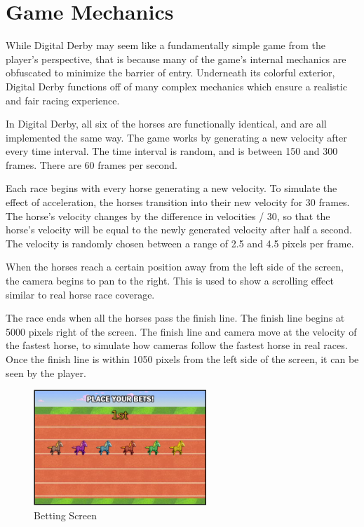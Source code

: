 \documentclass{article}
\begin{document}
\vspace{2ex}
\section{Game Mechanics}
{
While Digital Derby may seem like a fundamentally simple game from the player's perspective, that is because many of the game's internal mechanics are obfuscated to minimize the barrier of entry. Underneath its colorful exterior, Digital Derby functions off of many complex mechanics which ensure a realistic and fair racing experience.
\vspace{2ex}

In Digital Derby, all six of the horses are functionally identical, and are all implemented the same way. The game works by generating a new velocity after every time interval. The time interval is random, and is between 150 and 300 frames. There are 60 frames per second.

\vspace{2ex}

Each race begins with every horse generating a new velocity. To simulate the effect of acceleration, the horses transition into their new velocity for 30 frames. The horse’s velocity changes by the difference in velocities / 30, so that the horse’s velocity will be equal to the newly generated velocity after half a second. The velocity is randomly chosen between a range of 2.5 and 4.5 pixels per frame.

\vspace{2ex}

When the horses reach a certain position away from the left side of the screen, the camera begins to pan to the right. This is used to show a scrolling effect similar to real horse race coverage.

\vspace{2ex}

The race ends when all the horses pass the finish line. The finish line begins at 5000 pixels right of the screen. The finish line and camera move at the velocity of the fastest horse, to simulate how cameras follow the fastest horse in real races. Once the finish line is within 1050 pixels from the left side of the screen, it can be seen by the player. 

\vspace{2ex}
}

\begin{figure}[h]
\centering
\includegraphics[width=6.5cm]{images/placebets.png}
\caption{Betting Screen}
\end{figure}
\end{document}
